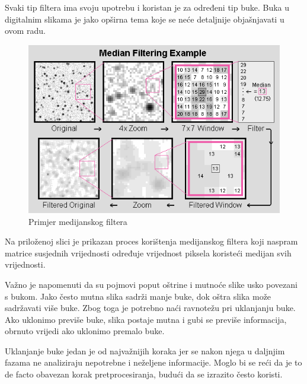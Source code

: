 \documentclass{foi}
\begin{document}
Svaki tip filtera ima svoju upotrebu i koristan je za određeni tip buke. Buka u digitalnim slikama je jako opširna tema koje se neće detaljnije objašnjavati u ovom radu.

\begin{figure}[H]
    \centering
    \includegraphics[width=0.85\linewidth]{slike/MedianFiltering.png}
    \caption{Primjer medijanskog filtera \cite{MeidanFilter}}
\end{figure}

Na priloženoj slici je prikazan proces korištenja medijanskog filtera koji naspram matrice susjednih vrijednosti određuje vrijednost piksela koristeći medijan svih vrijednosti.

Važno je napomenuti da su pojmovi poput oštrine i mutnoće  slike usko povezani s bukom. Jako često mutna slika sadrži manje buke, dok oštra slika može sadržavati više buke. Zbog toga je potrebno naći ravnotežu pri uklanjanju buke. Ako uklonimo previše buke, slika postaje mutna i gubi se previše informacija, obrnuto vrijedi ako uklonimo premalo buke.

Uklanjanje buke jedan je od najvažnijih koraka jer se nakon njega u daljnjim fazama ne analiziraju nepotrebne i neželjene informacije. Moglo bi se reći da je to de facto obavezan korak pretprocesiranja, budući da se izrazito često koristi.
\end{document}
